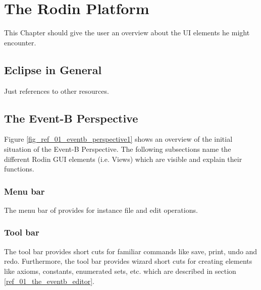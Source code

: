 \section{The Rodin Platform}
\label{reference_01}

This Chapter should give the user an overview about the UI elements he might encounter.

\subsection{Eclipse in General}

Just references to other resources.

\subsection{The Event-B Perspective}


Figure \ref{fig_ref_01_eventb_perspective1} shows an overview of the initial situation of the Event-B Perspective. The following subsections name the different Rodin GUI elements (i.e. Views) which are visible and explain their functions.


\subsubsection{Menu bar}

The menu bar of provides for instance file and edit operations.

\subsubsection{Tool bar}

The tool bar provides short cuts for familiar commands like save, print, undo and redo. Furthermore, the tool bar provides wizard short cuts for creating elements like axioms, constants, enumerated sets, etc. which are described in section \ref{ref_01_the_eventb_editor}.

